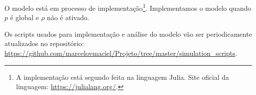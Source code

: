 O modelo está em processo de implementação\footnote{A implementação está segundo
feita na linguagem Julia. Site oficial da linguagem:
\url{https://julialang.org/}.}. Implementamos o modelo quando $p$ é global e $\rho$
não é ativado.

Os scripts usados para implementação e análise do modelo vão ser periodicamente
atualizados no repositório:
\url{https://github.com/marcelovmaciel/Projeto/tree/master/simulation_scripts}.





